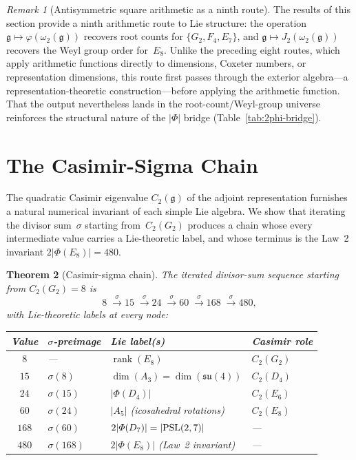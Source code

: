 \documentclass[11pt]{amsart}
\theoremstyle{plain}
\newtheorem{theorem}{Theorem}[section]
\theoremstyle{definition}
\theoremstyle{remark}
\newtheorem{remark}[theorem]{Remark}
\newcommand{\fg}{\mathfrak{g}}
\renewcommand{\Phi}{\varPhi}
\newcommand{\rank}{\operatorname{rank}}
\begin{document}
\begin{remark}[Antisymmetric square arithmetic as a ninth route]
The results of this section provide a ninth arithmetic route to Lie
structure: the operation $\fg \mapsto \varphi(\omega_2(\fg))$ recovers root
counts for $\{G_2, F_4, E_7\}$, and $\fg \mapsto J_2(\omega_2(\fg))$ recovers
the Weyl group order for~$E_8$.  Unlike the preceding eight routes, which
apply arithmetic functions directly to dimensions, Coxeter numbers, or
representation dimensions, this route first passes through the exterior
algebra---a representation-theoretic construction---before applying the
arithmetic function.  That the output nevertheless lands in the
root-count/Weyl-group universe reinforces the structural nature of the
$|\Phi|$ bridge (Table~\ref{tab:2phi-bridge}).
\end{remark}

\section{The Casimir-Sigma Chain}\label{sec:casimir-chain}

The quadratic Casimir eigenvalue $C_2(\fg)$ of the adjoint representation
furnishes a natural numerical invariant of each simple Lie algebra.  We show
that iterating the divisor sum~$\sigma$ starting from~$C_2(G_2)$ produces a
chain whose every intermediate value carries a Lie-theoretic label, and
whose terminus is the Law~2 invariant $2|\Phi(E_8)| = 480$.

\begin{theorem}[Casimir-sigma chain]\label{thm:casimir-chain}
The iterated divisor-sum sequence starting from $C_2(G_2) = 8$ is
\[
  8 \;\xrightarrow{\;\sigma\;}
  15 \;\xrightarrow{\;\sigma\;}
  24 \;\xrightarrow{\;\sigma\;}
  60 \;\xrightarrow{\;\sigma\;}
  168 \;\xrightarrow{\;\sigma\;}
  480,
\]
with Lie-theoretic labels at every node:
\begin{center}
\renewcommand{\arraystretch}{1.15}
\begin{tabular}{clll}
\toprule
Value & $\sigma$-preimage & Lie label(s) & Casimir role \\
\midrule
$8$   & ---               & $\rank(E_8)$                          & $C_2(G_2)$ \\
$15$  & $\sigma(8)$       & $\dim(A_3) = \dim(\mathfrak{su}(4))$  & $C_2(D_4)$ \\
$24$  & $\sigma(15)$      & $|\Phi(D_4)|$                         & $C_2(E_6)$ \\
$60$  & $\sigma(24)$      & $|A_5|$ (icosahedral rotations)       & $C_2(E_8)$ \\
$168$ & $\sigma(60)$      & $2|\Phi(D_7)| = |{\rm PSL}(2,7)|$    & --- \\
$480$ & $\sigma(168)$     & $2|\Phi(E_8)|$ (Law~2 invariant)      & --- \\
\bottomrule
\end{tabular}
\end{center}
\end{theorem}
\end{document}

